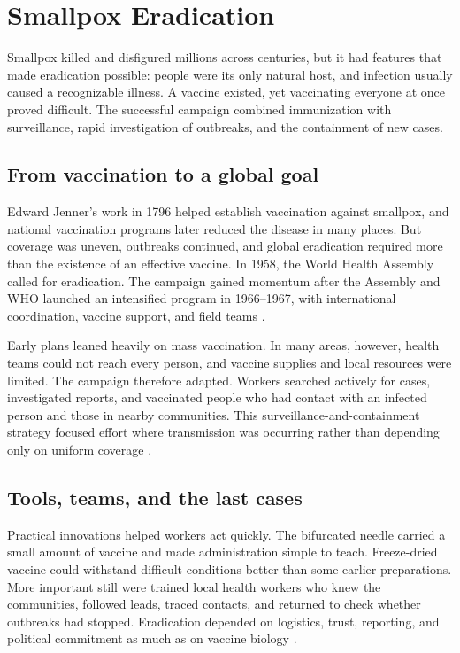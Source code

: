 \documentclass[12pt,oneside]{book}
\begin{document}
\chapter[Smallpox Eradication]{Smallpox Eradication}

Smallpox killed and disfigured millions across centuries, but it had features
that made eradication possible: people were its only natural host, and
infection usually caused a recognizable illness. A vaccine existed, yet
vaccinating everyone at once proved difficult. The successful campaign
combined immunization with surveillance, rapid investigation of outbreaks,
and the containment of new cases.

\section{From vaccination to a global goal}
Edward Jenner's work in 1796 helped establish vaccination against smallpox,
and national vaccination programs later reduced the disease in many places.
But coverage was uneven, outbreaks continued, and global eradication
required more than the existence of an effective vaccine. In 1958, the World
Health Assembly called for eradication. The campaign gained momentum after
the Assembly and WHO launched an intensified program in 1966--1967, with
international coordination, vaccine support, and field teams
\cite{whoSmallpoxVaccination,whoSmallpoxProgram}.

Early plans leaned heavily on mass vaccination. In many areas, however,
health teams could not reach every person, and vaccine supplies and local
resources were limited. The campaign therefore adapted. Workers searched
actively for cases, investigated reports, and vaccinated people who had
contact with an infected person and those in nearby communities. This
surveillance-and-containment strategy focused effort where transmission was
occurring rather than depending only on uniform coverage
\cite{cdcSmallpoxHistory,whoSmallpoxProgram}.

\section{Tools, teams, and the last cases}
Practical innovations helped workers act quickly. The bifurcated needle
carried a small amount of vaccine and made administration simple to teach.
Freeze-dried vaccine could withstand difficult conditions better than some
earlier preparations. More important still were trained local health
workers who knew the communities, followed leads, traced contacts, and
returned to check whether outbreaks had stopped. Eradication depended on
logistics, trust, reporting, and political commitment as much as on vaccine
biology \cite{whoSmallpoxProgram,cdcSmallpoxHistory}.
\end{document}
